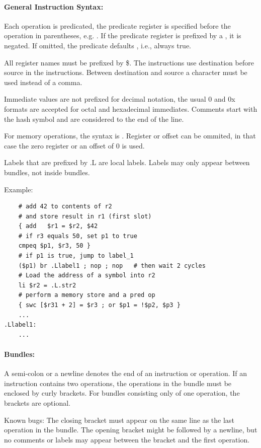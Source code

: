 \paragraph{General Instruction Syntax:}

Each operation is predicated, the predicate register is specified before the operation in
parentheses, e.g. .  If the predicate register is prefixed by a \code{!}, it is negated.
If omitted, the predicate defaults , i.e., always true.

All register names must be prefixed by \$. The instructions use destination before source in the
instructions. Between destination and source a \code{=} character must be used instead of a comma.

Immediate values are not prefixed for decimal notation, the usual 0 and 0x formats are accepted for
octal and hexadecimal immediates. Comments start with the hash symbol \code{\#} and are considered to the
end of the line.

For memory operations, the syntax is . Register or offset can be ommited, in
that case the zero register  or an offset of $0$ is used.

Labels that are prefixed by .L are local labels. Labels may only appear between bundles, not inside bundles.

Example:
\begin{verbatim}
    # add 42 to contents of r2
    # and store result in r1 (first slot)
    { add   $r1 = $r2, $42
    # if r3 equals 50, set p1 to true
    cmpeq $p1, $r3, 50 }
    # if p1 is true, jump to label_1
    ($p1) br .Llabel1 ; nop ; nop   # then wait 2 cycles
    # Load the address of a symbol into r2
    li $r2 = .L.str2
    # perform a memory store and a pred op
    { swc [$r31 + 2] = $r3 ; or $p1 = !$p2, $p3 }
    ...
.Llabel1:
    ...
\end{verbatim}


\paragraph{Bundles:}
A semi-colon \code{;} or a newline denotes the end of an instruction or operation. If an instruction contains
two operations, the operations in the bundle must be enclosed by curly brackets. For bundles consisting
only of one operation, the brackets are optional.

Known bugs:
The closing bracket must appear on the same line as the last operation in the bundle. The opening bracket might
be followed by a newline, but no comments or labels may appear between the bracket and the first operation.


